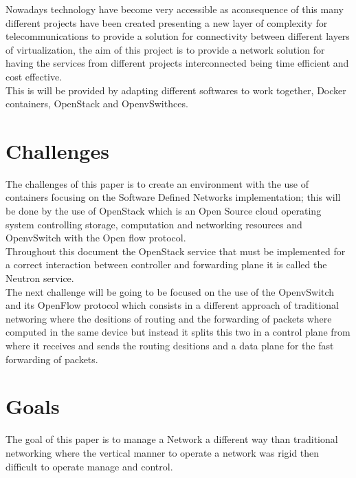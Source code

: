 Nowadays technology have become very accessible as aconsequence of this many different projects have been created presenting a new layer of complexity for telecommunications to provide a solution for connectivity between different layers of virtualization, the aim of this project is to provide a network solution for having the services from different projects interconnected being time efficient and cost effective.\\

This is will be provided by adapting different softwares to work together, Docker containers, OpenStack and OpenvSwithces.\\


\section{Challenges}
 
The challenges of this paper is to create an environment with the use of containers focusing on the Software Defined Networks implementation; this will be done by the use of OpenStack which is an Open Source cloud operating system controlling storage, computation and networking resources and OpenvSwitch with the Open flow protocol.\\

Throughout this document the OpenStack service that must be implemented for a correct interaction between controller and forwarding plane it is called the Neutron service.\\

The next challenge will be going to be focused on the use of the OpenvSwitch and its OpenFlow protocol which consists in a different approach of traditional networing where the desitions of routing and the forwarding of packets where computed in the same device but instead it splits this two in a control plane from where it receives and sends the routing desitions and a data plane for the fast forwarding of packets.\\
 
\section{Goals}
 
 
The goal of this paper is to manage a Network a different way than traditional networking where the vertical manner to operate a network was rigid then difficult to operate manage and control.\\

